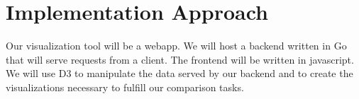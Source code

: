 \section{Implementation Approach}

Our visualization tool will be a webapp. We will host a backend written in Go that 
will serve requests from a client. The frontend will be written in javascript. We will use D3 to manipulate the data served
by our backend and to create the visualizations necessary to fulfill our comparison tasks.